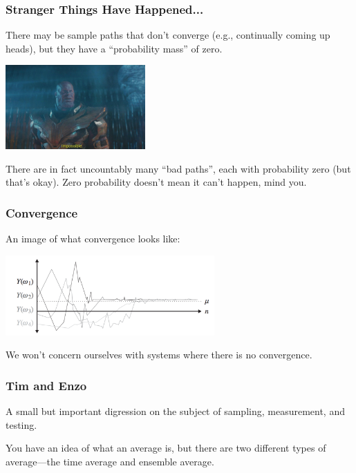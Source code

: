 \begin{frame}
\frametitle{Stranger Things Have Happened...}

There may be sample paths that don't converge (e.g., continually coming up heads), but they have a ``probability mass'' of zero.

\begin{center}
	\includegraphics[width=0.4\textwidth]{images/thanos.png}
\end{center}

There are in fact uncountably many ``bad paths'', each with probability zero (but that's okay). Zero probability doesn't mean it can't happen, mind you.

\end{frame}



\begin{frame}
\frametitle{Convergence}

An image of what convergence looks like:

\begin{center}
	\includegraphics[width=0.6\textwidth]{images/convergence.png}
\end{center}

We won't concern ourselves with systems where there is no convergence. 

\end{frame}



\begin{frame}
\frametitle{Tim and Enzo}

A small but important digression on the subject of sampling, measurement, and testing.

You have an idea of what an average is, but there are two different types of average---the time average and ensemble average. 


\end{frame}



